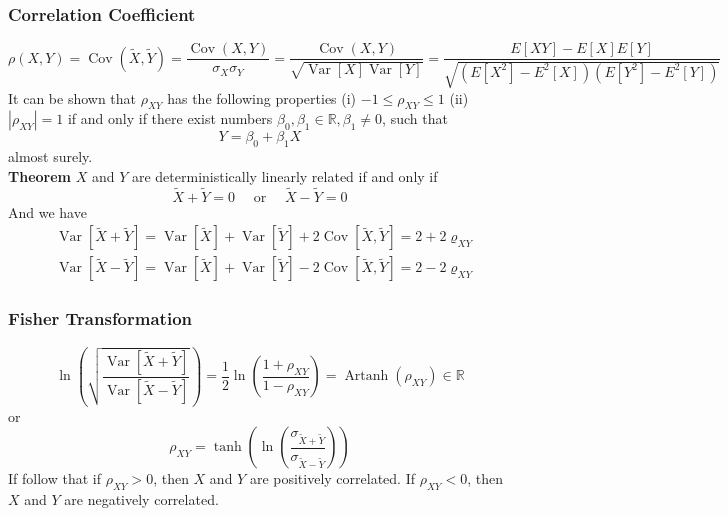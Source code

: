 \documentclass[a4paper,12pt]{article}
\begin{document}
    \subsubsection{Correlation Coefficient}
    \begin{equation}
        \rho(X,Y)=\operatorname{Cov}(\tilde{X},\tilde{Y})=\dfrac{\operatorname{Cov}(X,Y)}{\sigma_X \sigma_Y}=\dfrac{\operatorname{Cov}(X,Y)}{\sqrt{\operatorname{Var}[X]\operatorname{Var}[Y]}}=\dfrac{E[XY]-E[X]E[Y]}{\sqrt{(E[X^2]-E^2[X])(E[Y^2]-E^2[Y])}}
    \end{equation}
        It can be shown that $\rho_{X Y}$ has the following properties
(i) $-1 \leq \rho_{X Y} \leq 1$
(ii) $\left|\rho_{X Y}\right|=1$ if and only if there exist numbers $\beta_0, \beta_1 \in \mathbb{R}, \beta_1 \neq 0$, such that
$$
Y=\beta_0+\beta_1 X
$$
almost surely.\\
    \textbf{Theorem} $X$ and $Y$ are deterministically linearly related if and
    only if
    \begin{equation}
        \tilde{X}+\tilde{Y}=0 \quad \text { or } \quad \tilde{X}-\tilde{Y}=0
        \end{equation}
    And we have
    $$
\begin{aligned}
& \operatorname{Var}[\tilde{X}+\tilde{Y}]=\operatorname{Var}[\tilde{X}]+\operatorname{Var}[\tilde{Y}]+2 \operatorname{Cov}[\tilde{X}, \tilde{Y}]=2+2 \varrho_{X Y} \\
& \operatorname{Var}[\tilde{X}-\tilde{Y}]=\operatorname{Var}[\tilde{X}]+\operatorname{Var}[\tilde{Y}]-2 \operatorname{Cov}[\tilde{X}, \tilde{Y}]=2-2 \varrho_{X Y}
\end{aligned}
$$

    \subsubsection{Fisher Transformation}
    \begin{equation}
        \ln \left(\sqrt{\frac{\operatorname{Var}[\tilde{X}+\tilde{Y}]}{\operatorname{Var}[\tilde{X}-\tilde{Y}]}}\right)=\frac{1}{2} \ln \left(\frac{1+\rho_{X Y}}{1-\rho_{X Y}}\right)=\operatorname{Artanh}\left(\rho_{X Y}\right) \in \mathbb{R}
        \end{equation}
        or
        \begin{equation}
            \rho_{X Y}=\tanh \left(\ln \left(\frac{\sigma_{\tilde{X}+\tilde{Y}}}{\sigma_{\widetilde{X}-\tilde{Y}}}\right)\right)
            \end{equation}
    If follow that if $\rho_{XY}>0$, then $X$ and $Y$ are positively correlated. If $\rho_{XY}<0$, then $X$ and $Y$ are negatively correlated.
\end{document}
